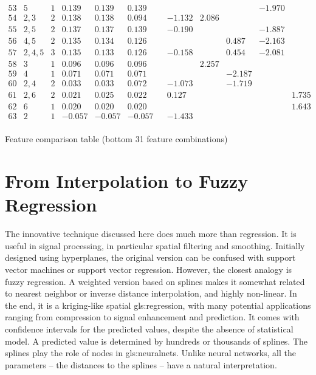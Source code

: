 \documentclass[oneside,10pt]{book}
\newcommand\Chapter[2]{
  \chapter[#1]{#1\\[2ex]\Large\itshape#2}
}
\begin{document}
\begin{table}
\[\begin{array}{lcc|rrr|rrrrrr}
53	&	5	&	1	&	0.139	&	0.139	&	0.139	&		&		&		&		&	-1.970	&		\\
54	&	2,3	&	2	&	0.138	&	0.138	&	0.094	&		&	-1.132	&	2.086	&		&		&		\\
55	&	2,5	&	2	&	0.137	&	0.137	&	0.139	&		&	-0.190	&		&		&	-1.887	&		\\
56	&	4,5	&	2	&	0.135	&	0.134	&	0.126	&		&		&		&	0.487	&	-2.163	&		\\
57	&	2,4,5	&	3	&	0.135	&	0.133	&	0.126	&		&	-0.158	&		&	0.454	&	-2.081	&		\\
58	&	3	&	1	&	0.096	&	0.096	&	0.096	&		&		&	2.257	&		&		&		\\
59	&	4	&	1	&	0.071	&	0.071	&	0.071	&		&		&		&	-2.187	&		&		\\
60	&	2,4	&	2	&	0.033	&	0.033	&	0.072	&		&	-1.073	&		&	-1.719	&		&		\\
61	&	2,6	&	2	&	0.021	&	0.025	&	0.022	&		&	0.127	&		&		&		&	1.735	\\
62	&	6	&	1	&	0.020	&	0.020	&	0.020	&		&		&		&		&		&	1.643	\\
63	&	2	&	1	&	-0.057	&	-0.057	&	-0.057	&		&	-1.433	&		&		&		&		\\

\end{array}
\]
\caption{\label{tabrr01}Feature comparison table (bottom 31 feature combinations)}
\end{table}

\Chapter{From Interpolation to Fuzzy Regression}{}\label{chapterfuzzy}

The innovative technique discussed here does much more than regression. It is useful in signal processing, in particular spatial filtering and smoothing. Initially designed
using hyperplanes, the original version can be confused with support vector machines or support vector regression. However, the closest analogy is fuzzy regression.
A weighted version based on splines makes it somewhat related to nearest neighbor or \textcolor{index}{inverse distance interpolation}, and highly non-linear.  In the end, it is a kriging-like spatial \gls{gls:regression},
with many potential applications ranging from compression to signal enhancement and prediction. It comes with confidence intervals for the predicted values,
despite the absence of statistical model. A predicted value is determined by hundreds or thousands of splines. The splines play the role of nodes 
in \glspl{gls:neuralnet}. Unlike neural networks, all the parameters -- the distances to the splines -- have a natural interpretation. 
\end{document}
